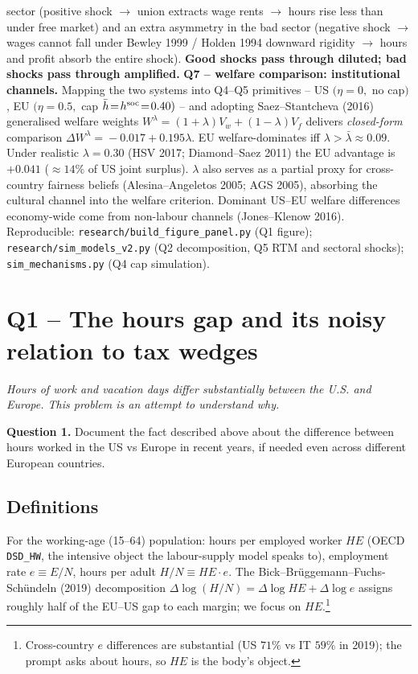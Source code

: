 \documentclass[9pt,a4paper]{extarticle}
\begin{document}
\begin{planbox}
sector (positive shock $\to$ union extracts wage rents $\to$ hours
rise less than under free market) and an extra asymmetry in the
bad sector (negative shock $\to$ wages cannot fall under Bewley
1999 / Holden 1994 downward rigidity $\to$ hours and profit absorb
the entire shock). \textbf{Good shocks pass through diluted; bad
shocks pass through amplified.}
\textbf{Q7 -- welfare comparison: institutional channels.} Mapping
the two systems into Q4--Q5 primitives -- US $(\eta\!=\!0,$ no
cap$)$, EU $(\eta\!=\!0.5,$ cap $\bar h\!=\!h^{\rm soc}\!=\!0.40)$
-- and adopting Saez--Stantcheva (2016) generalised welfare weights
$W^{\lambda}\!=\!(1\!+\!\lambda)V_w\!+\!(1\!-\!\lambda)V_f$ delivers
\emph{closed-form} comparison
$\Delta W^{\lambda}\!=\!-0.017+0.195\lambda$. EU welfare-dominates
iff $\lambda\!>\!\bar\lambda\!\approx\!0.09$. Under realistic
$\lambda\!=\!0.30$ (HSV 2017; Diamond--Saez 2011) the EU advantage
is $+0.041$ ($\approx\!14\%$ of US joint surplus). $\lambda$ also
serves as a partial proxy for cross-country fairness beliefs
(Alesina--Angeletos 2005; AGS 2005), absorbing the cultural channel
into the welfare criterion. Dominant US--EU welfare differences
economy-wide come from non-labour channels (Jones--Klenow 2016).
Reproducible: \texttt{research/build\_figure\_panel.py} (Q1 figure);
\texttt{research/sim\_models\_v2.py} (Q2 decomposition, Q5 RTM and
sectoral shocks); \texttt{sim\_mechanisms.py} (Q4 cap simulation).
\end{planbox}

\section{Q1 -- The hours gap and its noisy relation to tax wedges}

\begingroup\small\itshape\noindent
Hours of work and vacation days differ substantially between the
U.S. and Europe. This problem is an attempt to understand why.

\noindent\textbf{Question 1.} Document the fact described above
about the difference between hours worked in the US vs Europe in
recent years, if needed even across different European countries.
\endgroup

\subsection{Definitions}
For the working-age (15--64) population: hours per employed worker
$HE$ (OECD \texttt{DSD\_HW}, the intensive object the
labour-supply model speaks to), employment rate $e\!\equiv\!E/N$,
hours per adult $H/N\!\equiv\!HE\cdot e$. The
Bick--Br\"uggemann--Fuchs-Sch\"undeln (2019) decomposition
$\Delta\log(H/N)\!=\!\Delta\log HE\!+\!\Delta\log e$ assigns roughly
half of the EU--US gap to each margin; we focus on
$HE$.\footnote{\label{fn:extensive}Cross-country $e$ differences
are substantial (US $71\%$ vs IT $59\%$ in 2019); the prompt asks
about hours, so $HE$ is the body's object.}
\end{document}
